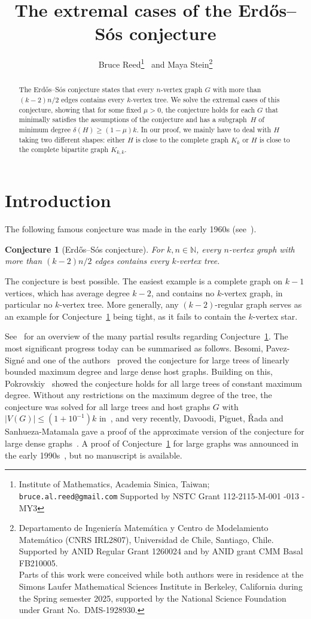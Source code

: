 \documentclass[12pt]{article}
\title{The extremal cases of the Erd\H os--S\'os conjecture}
\author{Bruce Reed\footnote{Institute of Mathematics, Academia Sinica, Taiwan; \texttt{bruce.al.reed@gmail.com} Supported by  NSTC Grant 112-2115-M-001 -013 -MY3} \  and Maya Stein\footnote{Departamento de Ingenier\'ia Matem\'atica y Centro de Modelamiento
Matem\'atico (CNRS IRL2807), Universidad de Chile, Santiago, Chile. Supported by ANID Regular Grant 1260024 and by ANID grant CMM Basal FB210005.\\ Parts of this work were conceived while both authors were in residence at the Simons Laufer Mathematical Sciences Institute in Berkeley, California during the Spring semester 2025, supported by the National Science Foundation under Grant No.~DMS-1928930.}}
\date{}
\newtheorem{conjecture}[theorem]{Conjecture}
\begin{document}
\maketitle

\begin{abstract}
The Erd\H os--S\'os conjecture states that every $n$-vertex graph $G$ with more than $(k-2)n/2$ edges contains every $k$-vertex tree.
    We solve the extremal cases of this conjecture, showing that for some fixed $\mu>0$, the conjecture holds for each $G$ that minimally satisfies the 
 assumptions of the conjecture and  has a subgraph~$H$ of minimum degree $\delta(H)\ge (1-\mu)k$. In our proof, we mainly have to deal with $H$ taking two different shapes: either $H$ is close to the complete graph $K_k$ or $H$ is close to the complete bipartite graph $K_{k,k}$.
\end{abstract}

\section{Introduction}

The following famous conjecture was made in the early 1960s (see~\cite{Erdos64}).

\begin{conjecture}[Erd\H os--S\'os conjecture]\label{es}
For $k, n\in\mathbb N$,  
every $n$-vertex graph with more than $(k-2)n/2$ edges contains every $k$-vertex tree.
\end{conjecture}

The conjecture is best possible. The easiest example is a complete graph on $k-1$ vertices, which has average degree $k-2$, and  contains no $k$-vertex graph, in particular no $k$-vertex  tree. More generally, any $(k-2)$-regular graph serves as an example for Conjecture~\ref{es} being tight, as it fails to contain the $k$-vertex star.  %

See~\cite{maya-survey} for an overview of the 
many partial results regarding Conjecture~\ref{es}. 
The most significant  progress  today can be summarised as follows. Besomi, Pavez-Sign\'e and one of the authors~\cite{BPS3} proved the conjecture  for  large trees of linearly bounded maximum degree  and large dense  host graphs. Building on this,  Pokrovskiy~\cite{Pok24} showed the conjecture holds for all large trees of constant maximum degree. Without any restrictions on the maximum degree of the tree, the conjecture was solved for all large trees and host graphs $G$ with $|V(G)|\le (1+10^{-1})k$ in~\cite{RS25}, and very recently, Davoodi,  Piguet, {\v R}ada and Sanhueza-Matamala
gave a proof of the approximate version of the conjecture  for large dense graphs~\cite{beyond}. 
A  proof of Conjecture~\ref{es} for  large graphs was announced in the early 1990s~\cite{AKSS:ES}, but no manuscript is available.
\end{document}
